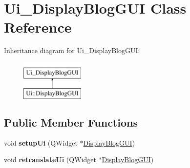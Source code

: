\hypertarget{classUi__DisplayBlogGUI}{}\section{Ui\+\_\+\+Display\+Blog\+G\+UI Class Reference}
\label{classUi__DisplayBlogGUI}
Inheritance diagram for Ui\+\_\+\+Display\+Blog\+G\+UI\+:\begin{figure}[H]
\begin{center}
\leavevmode
\includegraphics[height=2.000000cm]{classUi__DisplayBlogGUI}
\end{center}
\end{figure}
\subsection*{Public Member Functions}
\begin{DoxyCompactItemize}
\item 
void {\bfseries setup\+Ui} (Q\+Widget $\ast$\hyperlink{classDisplayBlogGUI}{Display\+Blog\+G\+UI})\hypertarget{classUi__DisplayBlogGUI_a63552d1d428adc04bbf8617189f6a37d}{}\label{classUi__DisplayBlogGUI_a63552d1d428adc04bbf8617189f6a37d}

\item 
void {\bfseries retranslate\+Ui} (Q\+Widget $\ast$\hyperlink{classDisplayBlogGUI}{Display\+Blog\+G\+UI})\hypertarget{classUi__DisplayBlogGUI_a7c867648f2948a5e2b4425cf4521585e}{}\label{classUi__DisplayBlogGUI_a7c867648f2948a5e2b4425cf4521585e}

\end{DoxyCompactItemize}
